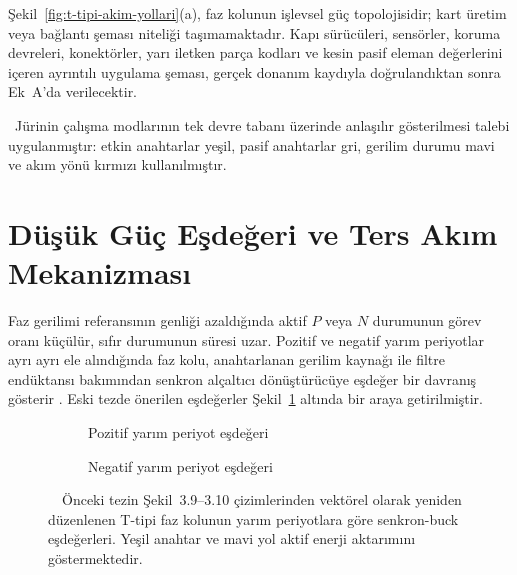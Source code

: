 \begin{samepage}
  Şekil~\ref{fig:t-tipi-akim-yollari}(a), faz kolunun işlevsel güç topolojisidir; kart üretim veya bağlantı şeması niteliği taşımamaktadır. Kapı sürücüleri, sensörler, koruma devreleri, konektörler, yarı iletken parça kodları ve kesin pasif eleman değerlerini içeren ayrıntılı uygulama şeması, gerçek donanım kaydıyla doğrulandıktan sonra Ek~A'da verilecektir.

  \begin{center}
  \juriistegietiketi\ \small Jürinin çalışma modlarının tek devre tabanı üzerinde anlaşılır gösterilmesi talebi uygulanmıştır: etkin anahtarlar yeşil, pasif anahtarlar gri, gerilim durumu mavi ve akım yönü kırmızı kullanılmıştır.
  \end{center}
\end{samepage}


\section{Düşük Güç Eşdeğeri ve Ters Akım Mekanizması}

Faz gerilimi referansının genliği azaldığında aktif $P$ veya $N$ durumunun görev oranı küçülür, sıfır durumunun süresi uzar. Pozitif ve negatif yarım periyotlar ayrı ayrı ele alındığında faz kolu, anahtarlanan gerilim kaynağı ile filtre endüktansı bakımından senkron alçaltıcı dönüştürücüye eşdeğer bir davranış gösterir \citep{Mohan2003,Erickson2001}. Eski tezde önerilen eşdeğerler Şekil~\ref{fig:senkron-buck-esdeger} altında bir araya getirilmiştir.

\begin{figure}[htbp]
  \centering
  \begin{subfigure}[t]{0.46\textwidth}
    \centering
    \caption{Pozitif yarım periyot eşdeğeri}
  \end{subfigure}\hfill
  \begin{subfigure}[t]{0.46\textwidth}
    \centering
    \caption{Negatif yarım periyot eşdeğeri}
  \end{subfigure}
  \caption{\eskitezetiketi\ \juriistegietiketi\ Önceki tezin Şekil~3.9--3.10 çizimlerinden vektörel olarak yeniden düzenlenen T-tipi faz kolunun yarım periyotlara göre senkron-buck eşdeğerleri. Yeşil anahtar ve mavi yol aktif enerji aktarımını göstermektedir.}
  \label{fig:senkron-buck-esdeger}
\end{figure}

